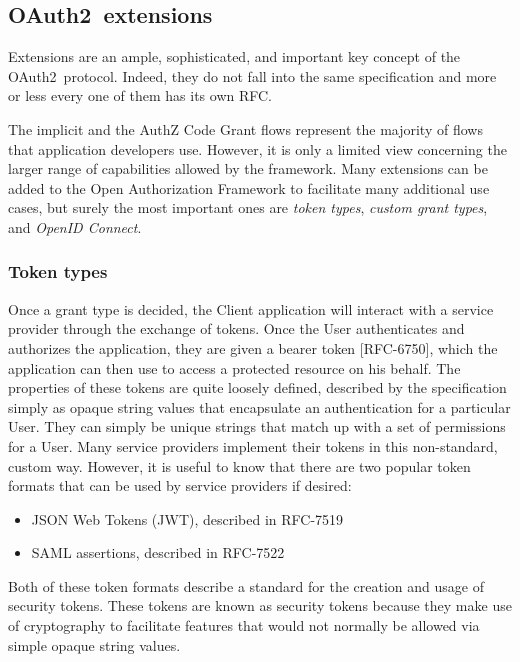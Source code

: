 \documentclass[a4paper,12pt]{article}
\def\oauth{OAuth2\xspace}
\def\rfc#1{RFC-#1\xspace}
\begin{document}
\subsection{\oauth\ extensions}
Extensions are an ample, sophisticated, and important key concept of the \oauth\ protocol. Indeed, they do not fall into the same specification and more or less every one of them has its own RFC.

The implicit and the AuthZ Code Grant flows represent the majority of flows that application developers use. However, it is only a limited view concerning the larger range of capabilities allowed by the framework. Many extensions can be added to the Open Authorization Framework to facilitate many additional use cases, but surely the most important ones are \textit{token types}, \textit{custom grant types}, and \textit{OpenID Connect}.

\subsubsection{Token types}
Once a grant type is decided, the Client application will interact with a service provider through the exchange of tokens. Once the User authenticates and authorizes the application, they are given a bearer token [\rfc{6750}], which the application can then use to access a protected resource on his behalf. The properties of these tokens are quite loosely defined, described by the specification simply as opaque string values that encapsulate an authentication for a particular User. They can simply be unique strings that match up with a set of permissions for a User. Many service providers implement their tokens in this non-standard, custom way. However, it is useful to know that there are two popular token formats that can be used by service providers if desired:

\begin{itemize}
    \item JSON Web Tokens (JWT), described in \rfc{7519} \cite{RFC7519}
    \item SAML assertions, described in \rfc{7522}
\end{itemize}

Both of these token formats describe a standard for the creation and usage of security tokens. These tokens are known as security tokens because they make use of cryptography to facilitate features that would not normally be allowed via simple opaque string values.
\end{document}
